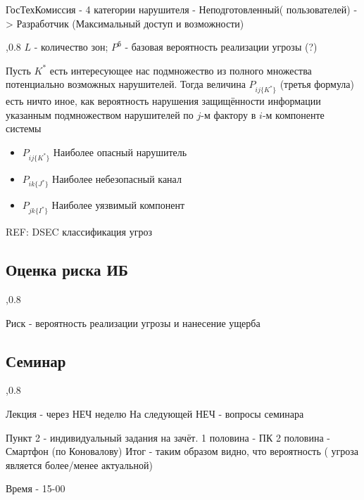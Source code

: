 \documentclass[a4paper,12pt]{report}
\begin{document}
		ГосТехКомиссия - 4 категории нарушителя - Неподготовленный( пользователей) -> Разработчик (Максимальный доступ и возможности)

		,0.8
		$L$ - количество зон;
		$P^{\mbox{б}}$ - базовая вероятность реализации угрозы (?)

		Пусть $K^*$ есть интересующее нас подмножество из полного множества потенциально возможных нарушителей. Тогда величина $P_{ij\{K^*\}}$ (третья формула) есть ничто иное, как вероятность нарушения защищённости информации указанным подмножеством нарушителей по $j$-м фактору в $i$-м компоненте системы
		\begin{itemize}
			\item $P_{ij\{K^*\}}$		Наиболее опасный нарушитель
			\item $P_{ik\{J^*\}}$		Наиболее небезопасный канал
			\item $P_{jk\{I^*\}}$		Наиболее уязвимый компонент
		\end{itemize}

		REF: DSEC классификация угроз

		\subsection{Оценка риска ИБ}
		,0.8

		Риск - вероятность реализации угрозы и нанесение ущерба

	\subsection{Семинар}
		,0.8

		Лекция - через НЕЧ неделю
		На следующей НЕЧ - вопросы семинара

		Пункт 2 - индивидуальный задания на зачёт.
		1 половина  - ПК
		2 половина - Смартфон
		(по Коновалову)
		Итог  - таким  образом видно, что вероятность ( угроза является более/менее актуальной)

		Время - 15-00
\end{document}
